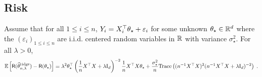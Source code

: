 \subsection{Risk}
\begin{proposition}
\label{prop:risk:ridge}
Assume that for all $1\leqslant i \leqslant n$, $Y_i = X^\top_i \theta_{\star} + \varepsilon_i$ for some unknown $\theta_\star\in\mathbb{R}^d$ where the $(\varepsilon_i)_{1\leqslant i\leqslant n}$ are i.i.d. centered random variables in $\mathbb{R}$ with variance $\sigma_\star^2$. For all $\lambda>0$,
$$
\mathbb{E}\left[\mathsf{R}(\widehat {\theta}^{\mathrm{ridge}}_{n,\lambda}) - \mathsf{R}(\theta_\star)\right] = \lambda^2\theta_\star^\top\left(\frac{1}{n}X^\top X + \lambda \mathrm{I}_d\right)^{-2} \frac{1}{n}X^\top X \theta_\star +\frac{\sigma_\star^{2}}{n}\mathrm{Trace}\left((n^{-1}X^\top X)^2(n^{-1}X^\top X + \lambda \mathrm{I}_d)^{-2}\right)\;.
$$
\end{proposition}
